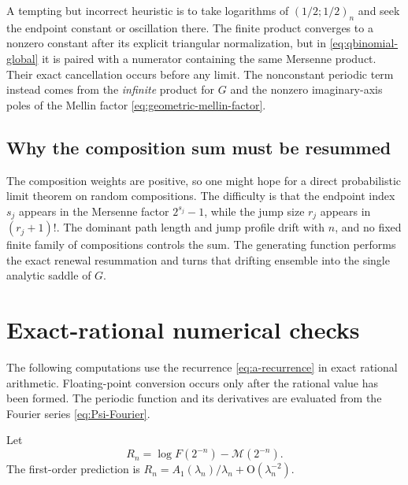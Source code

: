 \documentclass[11pt,oneside]{article}
\theoremstyle{definition}
\theoremstyle{remark}
\newcommand{\bigO}{\mathrm O}
\newcommand{\Mmain}{\mathcal M}
\begin{document}
A tempting but incorrect heuristic is to take logarithms of
$(1/2;1/2)_n$ and seek the endpoint constant or oscillation there.  The finite product converges to a nonzero constant after its explicit triangular normalization, but in
\eqref{eq:qbinomial-global} it is paired with a numerator containing the same Mersenne product.  Their exact cancellation occurs before any limit.  The nonconstant periodic term instead comes from the \emph{infinite} product for $G$ and the nonzero imaginary-axis poles of the Mellin factor \eqref{eq:geometric-mellin-factor}.

\subsection{Why the composition sum must be resummed}

The composition weights are positive, so one might hope for a direct probabilistic limit theorem on random compositions.  The difficulty is that the endpoint index $s_j$ appears in the Mersenne factor $2^{s_j}-1$, while the jump size $r_j$ appears in $(r_j+1)!$.  The dominant path length and jump profile drift with $n$, and no fixed finite family of compositions controls the sum.  The generating function performs the exact renewal resummation and turns that drifting ensemble into the single analytic saddle of $G$.

\section{Exact-rational numerical checks}
\label{sec:numerics}

The following computations use the recurrence \eqref{eq:a-recurrence} in exact rational arithmetic.  Floating-point conversion occurs only after the rational value has been formed.  The periodic function and its derivatives are evaluated from the Fourier series \eqref{eq:Psi-Fourier}.

Let
\begin{equation}
 R_n=\log F(2^{-n})-\Mmain(2^{-n}).
\label{eq:Rn-def}
\end{equation}
The first-order prediction is
$R_n=A_1(\lambda_n)/\lambda_n+\bigO(\lambda_n^{-2})$.
\end{document}
